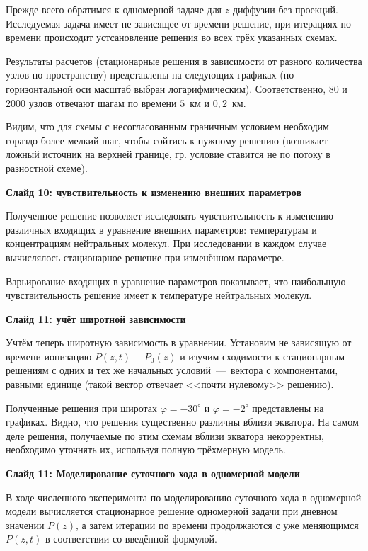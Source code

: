 \documentclass[2pt, a4paper, fleqn]{extarticle}
\begin{document}
Прежде всего обратимся к одномерной задаче для $z$-диффузии без проекций. Исследуемая задача имеет не зависящее от времени решение, при итерациях по времени происходит устсановление решения во всех трёх указанных схемах. 

Результаты расчетов (стационарные решения в зависимости от разного количества узлов по пространству) представлены на следующих графиках (по горизонтальной оси масштаб выбран логарифмическим). Соответственно, $80$ и $2000$ узлов отвечают шагам по времени $5$~км и $0{,}2$~км.

Видим, что для схемы с несогласованным граничным условием необходим гораздо более мелкий шаг, чтобы сойтись к нужному решению (возникает ложный источник на верхней границе, гр. условие ставится не по потоку в разностной схеме).

\medskip
 
{\bf Слайд 10: чувствительность к изменению внешних параметров}

Полученное решение позволяет исследовать чувствительность к изменению различных входящих в уравнение внешних параметров: температурам и концентрациям нейтральных молекул. При исследовании в каждом случае вычислялось стационарное решение при изменённом параметре.

Варьирование входящих в уравнение параметров показывает, что наибольшую чувствительность решение имеет к температуре нейтральных молекул. 

\medskip

{\bf Слайд 11: учёт широтной зависимости}

Учтём теперь широтную зависимость в уравнении.  Установим не зависящую от времени ионизацию $P(z, t) \equiv P_0(z)$ и изучим сходимости к стационарным решениям с одних и тех же начальных условий~---~вектора с компонентами, равными единице (такой вектор отвечает <<почти нулевому>> решению). 

Полученные решения при широтах $\varphi = -30^\circ$ и $\varphi=-2^\circ$ представлены на графиках. Видно, что решения существенно различны вблизи экватора. На самом деле решения, получаемые по этим схемам вблизи экватора некорректны, необходимо уточнять их, используя полную трёхмерную модель.

\medskip

{\bf Слайд 11: Моделирование суточного хода в одномерной модели}

В ходе численного эксперимента по моделированию суточного хода в одномерной модели вычисляется стационарное решение одномерной задачи при дневном значении $P(z)$, а затем итерации по времени продолжаются с уже меняющимся $P(z, t)$ в соответствии со введённой формулой.
\end{document}
